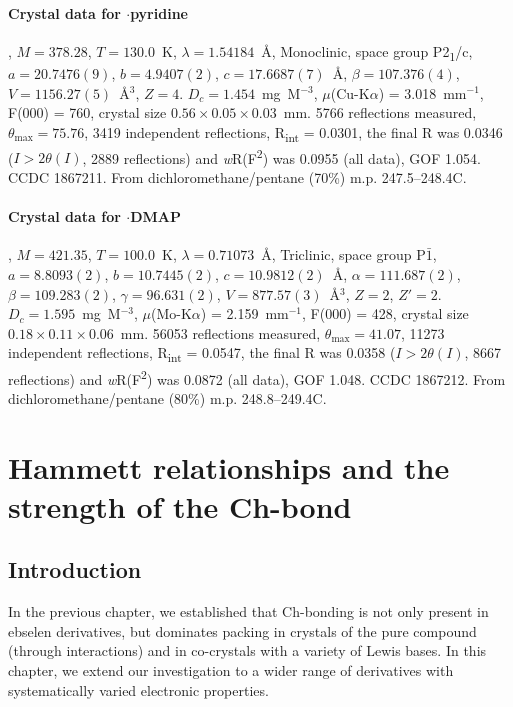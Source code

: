\subsubsection{Crystal data for $\cdot$pyridine}
, $M=378.28$, $T=130.0$~K, $\lambda=1.54184$~\AA, Monoclinic, space group P2\textsubscript{1}/c, $a = 20.7476(9)$, $b = 4.9407(2)$, $c = 17.6687(7)$~\AA, $\beta = 107.376(4)$\degree, $V = 1156.27(5)$~\AA$^{3}$, $Z = 4$.
$D_{c} = 1.454$~mg~M$^{-3}$, $\mu$(Cu-K$\alpha$) = 3.018~mm$^{-1}$, F(000) = 760, crystal size $0.56 \times 0.05 \times 0.03$~mm.
5766 reflections measured, $\theta_{\mathrm{max}} = 75.76$\degree, 3419 independent reflections, R\textsubscript{int} = 0.0301, the final R was 0.0346 ($I > 2\theta(I)$, 2889 reflections) and \emph{w}R(F\textsuperscript{2}) was 0.0955 (all data), GOF 1.054. 
CCDC 1867211. 
From dichloromethane/pentane (70\%) m.p. 247.5--248.4\degree C.

\subsubsection{Crystal data for $\cdot$DMAP}
, $M = 421.35$, $T=100.0$~K, $\lambda=0.71073$~\AA, Triclinic, space group P$\bar{1}$, $a = 8.8093(2)$, $b = 10.7445(2)$, $c = 10.9812(2)$~\AA, $\alpha = 111.687(2)$\degree, $\beta = 109.283(2)$\degree, $\gamma = 96.631(2)$\degree, $V = 877.57(3)$~\AA$^{3}$, $Z = 2$, $Z\prime = 2$.
$D_{c}= 1.595$~mg~M$^{-3}$, $\mu$(Mo-K$\alpha$) = 2.159~mm$^{-1}$, F(000) = 428, crystal size $0.18 \times 0.11 \times 0.06$~mm.
56053 reflections measured, $\theta_{\mathrm{max}} = 41.07$\degree, 11273 independent reflections, R\textsubscript{int} = 0.0547, the final R was 0.0358 ($I > 2\theta(I)$, 8667 reflections) and \emph{w}R(F\textsuperscript{2}) was 0.0872 (all data), GOF 1.048. 
CCDC 1867212. 
From dichloromethane/pentane (80\%) m.p. 248.8--249.4\degree C.


\chapter{Hammett relationships and the strength of the Ch-bond}

\section{Introduction}
In the previous chapter, we established that Ch-bonding is not only present in ebselen derivatives, but dominates packing in crystals of the pure compound (through  interactions) and in co-crystals with a variety of Lewis bases.
In this chapter, we extend our investigation to a wider range of derivatives with systematically varied electronic properties.

